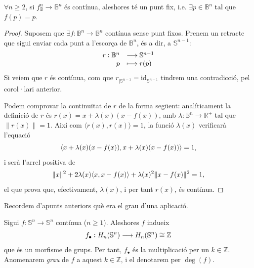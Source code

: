 \documentclass[../main.tex]{subfiles}
\begin{document}
\begin{coro}
\label{ter:puntfixdebrower} $\forall n\geq 2$, si $f_\mathbb{B}^n\rightarrow\mathbb{B}^n$ és contínua, aleshores té un punt fix, i.e. $\exists p\in\mathbb{B}^n$ tal que $f(p) = p$. 
\end{coro}
\begin{proof}
Suposem que $\exists f:\mathbb{B}^n\rightarrow \mathbb{B}^n$ contínua sense punt fixos. Prenem un retracte que sigui enviar cada punt a l'escorça de $\mathbb{B}^n$, és a dir, a $\mathbb{S}^{n-1}$:
\begin{equation}
    \notag
    \begin{array}{rl}
        r:\mathbb{B}^n & \longrightarrow\mathbb{S}^{n-1} \\
        p & \longmapsto r(p)
    \end{array}
\end{equation}
Si veiem que $r$ és contínua, com que $r_{|\mathbb{S}^{n-1}} = \mathrm{id}_{\mathbb{S}^{n-1}}$ tindrem una contradicció, pel corol·lari anterior. 

Podem comprovar la continuïtat de $r$ de la forma següent: analíticament la definició de $r$ és $r(x) = x+\lambda(x)(x-f(x))$, amb $\lambda:\mathbb{B}^n\rightarrow\mathbb{R}^+$ tal que $\|r(x)\|=1$. Així com $\langle r(x),r(x)\rangle = 1$, la funció $\lambda(x)$ verificarà l'equació
\begin{equation}
    \notag
    \langle x+\lambda(x)(x-f(x)),x+\lambda(x)(x-f(x))\rangle = 1,
\end{equation}
i serà l'arrel positiva de 
\begin{equation}
    \notag
    \|x\|^2+2\lambda(x)\langle x,x-f(x)\rangle + \lambda(x)^2\|x-f(x)\|^2 = 1,
\end{equation}
el que prova que, efectivament, $\lambda(x)$, i per tant $r(x)$, és contínua.
\end{proof}

Recordem d'apunts anteriors què era el grau d'una aplicació. 
\begin{defi}
[Grau] Sigui $f:\mathbb{S}^n\rightarrow \mathbb{S}^n$ contínua ($n\geq 1$). Aleshores $f$ indueix
\begin{equation}
    \notag
    f_\bullet:H_n(\mathbb{S}^n)\longrightarrow H_n(\mathbb{S}^n)\cong \mathbb{Z}
\end{equation}
que és un morfisme de grups. Per tant, $f_\bullet$ és la multiplicació per un $k\in\mathbb{Z}$. Anomenarem \textit{grau} de $f$ a aquest $k\in\mathbb{Z}$, i el denotarem per $\deg(f)$.
\end{defi}
\end{document}
